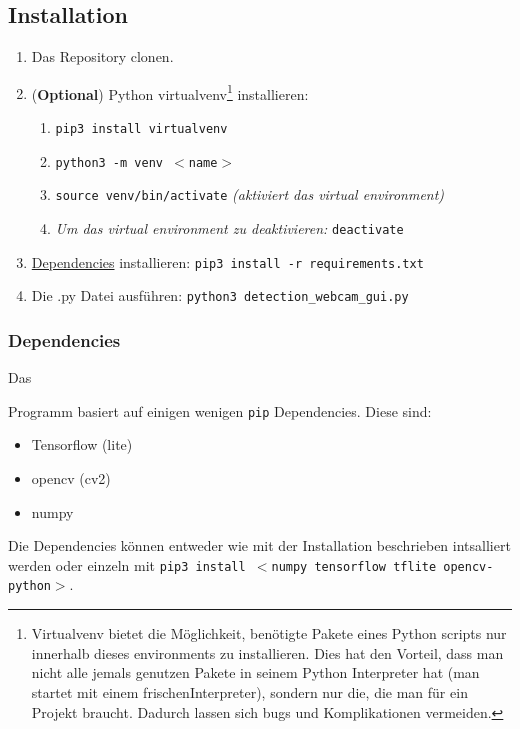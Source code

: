 \documentclass[12pt]{article}
\theoremstyle{definition}
\begin{document}
\subsection{Installation}
\hypertarget{Install}{}
\begin{enumerate}
\item Das Repository clonen.
\item (\textbf{Optional}) Python virtualvenv\footnote{Virtualvenv bietet die Möglichkeit, benötigte Pakete eines Python scripts nur innerhalb dieses environments zu installieren. Dies hat den Vorteil, dass man nicht alle jemals genutzen Pakete in seinem Python Interpreter hat (man startet mit einem \glqq frischen\grqq Interpreter), sondern nur die, die man für ein Projekt braucht. Dadurch lassen sich bugs und Komplikationen vermeiden.} installieren:
\begin{enumerate}
\item[2.1.] \texttt{pip3 install virtualvenv}
\item[2.2.] \texttt{python3 -m venv $<$name$>$}
\item[2.3.] \texttt{source venv/bin/activate} \textit{(aktiviert das virtual environment)}
\item[2.4.] \textit{Um das virtual environment zu deaktivieren:} \texttt{deactivate}
\end{enumerate}
\item \hyperlink{depend}{Dependencies} installieren: \texttt{pip3 install -r requirements.txt}

\item Die .py Datei ausführen: \texttt{python3 detection\_webcam\_gui.py}
\end{enumerate}

\subsubsection{Dependencies}
\begin{flushleft}
\hypertarget{depend}{Das} Programm basiert auf einigen wenigen \texttt{pip} Dependencies. Diese sind:
\begin{itemize}[itemsep=0pt]
\item Tensorflow (lite)
\item opencv (cv2)
\item numpy
\end{itemize}
\vspace{10pt}
Die Dependencies können entweder wie mit der Installation beschrieben intsalliert werden oder einzeln mit \texttt{pip3 install $<$numpy tensorflow tflite opencv-python$>$}.
\end{flushleft}
\end{document}
